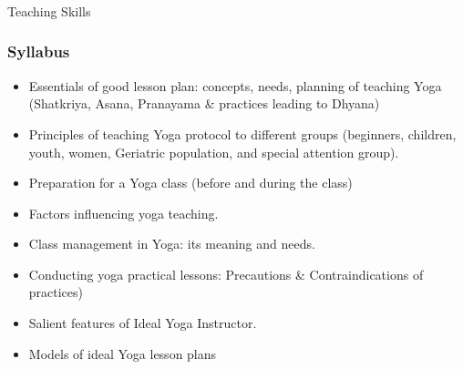 \begin{frame}[fragile]\frametitle{}
\begin{center}
{\Large Teaching Skills }
\end{center}
\end{frame}

\begin{frame}[fragile]\frametitle{Syllabus}

\begin{itemize}
\item  Essentials  of  good  lesson  plan:  concepts,  needs,  planning  of  teaching  Yoga  (Shatkriya, Asana, Pranayama \& practices leading to Dhyana) 
\item  Principles  of  teaching  Yoga  protocol  to  different  groups  (beginners,  children,  youth, women, Geriatric population, and special attention group). 
\item  Preparation for a Yoga class (before and during the class) 
\item  Factors influencing yoga teaching. 
\item  Class management in Yoga: its meaning and needs. 
\item  Conducting yoga practical lessons: Precautions \& Contraindications of practices)  
\item  Salient features of Ideal Yoga Instructor.  
\item  Models of ideal Yoga lesson plans 
\end{itemize}
\end{frame}